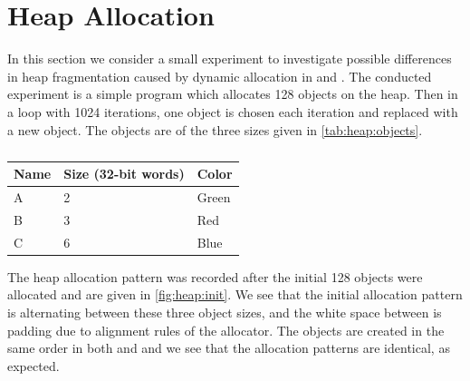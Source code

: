 \section{Heap Allocation}

In this section we consider a small experiment to investigate possible differences in heap fragmentation caused by dynamic allocation in {\C} and {\rust}.
The conducted experiment is a simple program which allocates 128 objects on the heap.
Then in a loop with 1024 iterations, one object is chosen each iteration and replaced with a new object.
The objects are of the three sizes given in \autoref{tab:heap:objects}.

\begin{table}[H]
  \centering
  \begin{tabular}{l|l|l}
    \textbf{Name} & \textbf{Size (32-bit words)} & \textbf{Color} \\
    \hline
    A & 2 & Green \\
    B & 3 & Red \\
    C & 6 & Blue \\
    \hline
  \end{tabular}
  \caption{}
  \label{tab:heap:objects}
\end{table}

The heap allocation pattern was recorded after the initial 128 objects were allocated and are given in \autoref{fig:heap:init}.
We see that the initial allocation pattern is alternating between these three object sizes, and the white space between is padding due to alignment rules of the allocator.
The objects are created in the same order in both {\C} and {\rust} and we see that the allocation patterns are identical, as expected.

